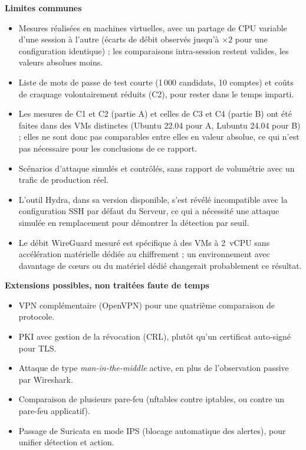 \documentclass[11pt,a4paper]{article}
\begin{document}
\textbf{Limites communes}
\begin{itemize}
  \item Mesures réalisées en machines virtuelles, avec un partage de CPU variable d'une session à
        l'autre (écarts de débit observés jusqu'à $\times 2$ pour une configuration identique) ; les
        comparaisons intra-session restent valides, les valeurs absolues moins.
  \item Liste de mots de passe de test courte (1\,000 candidats, 10 comptes) et coûts de craquage
        volontairement réduits (C2), pour rester dans le temps imparti.
  \item Les mesures de C1 et C2 (partie A) et celles de C3 et C4 (partie B) ont été faites dans des
        VMs distinctes (Ubuntu 22.04 pour A, Lubuntu 24.04 pour B) ; elles ne sont donc pas
        comparables entre elles en valeur absolue, ce qui n'est pas nécessaire pour les
        conclusions de ce rapport.
  \item Scénarios d'attaque simulés et contrôlés, sans rapport de volumétrie avec un trafic de
        production réel.
  \item L'outil Hydra, dans sa version disponible, s'est révélé incompatible avec la configuration
        SSH par défaut du Serveur, ce qui a nécessité une attaque simulée en remplacement pour
        démontrer la détection par seuil.
  \item Le débit WireGuard mesuré est spécifique à des VMs à 2~vCPU sans accélération matérielle
        dédiée au chiffrement ; un environnement avec davantage de c\oe urs ou du matériel dédié
        changerait probablement ce résultat.
\end{itemize}

\textbf{Extensions possibles, non traitées faute de temps}
\begin{itemize}
  \item VPN complémentaire (OpenVPN) pour une quatrième comparaison de protocole.
  \item PKI avec gestion de la révocation (CRL), plutôt qu'un certificat auto-signé pour TLS.
  \item Attaque de type \emph{man-in-the-middle} active, en plus de l'observation passive par
        Wireshark.
  \item Comparaison de plusieurs pare-feu (nftables contre iptables, ou contre un pare-feu
        applicatif).
  \item Passage de Suricata en mode IPS (blocage automatique des alertes), pour unifier détection
        et action.
\end{itemize}
\end{document}
